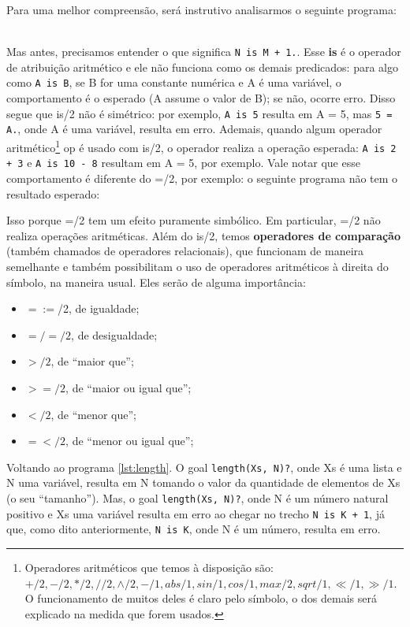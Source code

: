 \documentclass{article}
\theoremstyle{remark}
\begin{document}
Para uma melhor compreensão, será instrutivo analisarmos o seguinte programa:
\\
\\


\label{lst:length}

Mas antes, precisamos entender o que significa {\tt N is M + 1.}. Esse \textbf{is} é o operador de atribuição aritmético e ele não funciona como os demais predicados: para algo como {\tt A is B}, se B for uma constante numérica e A é uma variável, o comportamento é o esperado (A assume o valor de B); se não, ocorre erro. Disso segue que is/2 não é simétrico: por exemplo, {\tt A is 5} resulta em A = 5, mas {\tt 5 = A.}, onde A é uma variável, resulta em erro. Ademais, quando algum
operador aritmético\footnote{Operadores aritméticos que temos à disposição são: $+/2, -/2, */2, //2, \wedge/2, -/1, abs/1, sin/1, cos/1, max/2, sqrt/1, \ll/1, \gg/1$. O funcionamento de muitos deles é claro pelo símbolo, o dos demais será explicado na medida que forem usados.} op é usado com is/2, o operador realiza a operação esperada: {\tt A is 2 + 3} e {\tt A is 10 - 8} resultam em A = 5, por exemplo. Vale notar que esse comportamento é diferente do =/2, por exemplo: o seguinte programa não tem o resultado esperado:



\noindent Isso porque =/2 tem um efeito puramente simbólico. Em particular, =/2 não realiza operações aritméticas. Além do is/2, temos \textbf{operadores de comparação} (também chamados de operadores relacionais), que funcionam de maneira semelhante e também possibilitam o uso de operadores aritméticos à direita do símbolo, na maneira usual. Eles serão de alguma importância:

\begin{itemize}
  \item $=:=$/2, de igualdade;
  \item $=/=/2$, de desigualdade;
  \item $>/2  $, de ``maior que'';
  \item $>=/2$, de ``maior ou igual que'';
  \item $</2 $, de ``menor que'';
  \item $=</2$, de ``menor ou igual que'';
\end{itemize}

Voltando ao programa \ref{lst:length}. O goal {\tt length(Xs, N)?}, onde Xs é uma lista e N uma variável, resulta em N tomando o valor da quantidade de elementos de Xs (o seu ``tamanho'').  Mas, o goal {\tt length(Xs, N)?}, onde N é um número natural positivo e Xs uma variável resulta em erro ao chegar no trecho {\tt N is K + 1}, já que, como dito anteriormente, {\tt N is K}, onde N é um número, resulta em erro.
\end{document}

